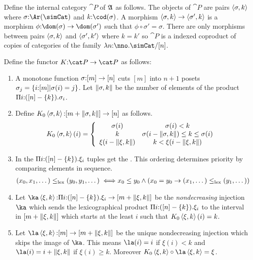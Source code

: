 \documentclass[csh.tex]{subfiles}
\begin{document}
\begin{definition}
Define the internal category $\cat P$ of $\mathfrak A$ as follows. The objects of $\cat P$ are pairs $\left\langle \sigma,k \right\rangle$ where $\sigma\of\Ar(\simCat)$ and $k\of \cod(\sigma)$. A morphism $\left\langle \sigma,k \right\rangle\to \left\langle \sigma',k \right\rangle$ is a morphism $\phi\of \dom(\sigma)\to \dom(\sigma')$ such that $\phi\circ \sigma'= \sigma$. There are only morphisms between pairs $\left\langle \sigma,k \right\rangle$ and $\left\langle \sigma',k' \right\rangle$ where $k=k'$ so $\cat P$ is a indexed coproduct of copies of categories of the family $\function{n\of\nno}\simCat/[n]$.

Define the functor $K\of \cat P\to\cat P$ as follows:
\begin{enumerate}
\item A monotone function $\sigma\mathord :[m]\to[n]$ cuts $[m]$ into $n + 1$ posets $\sigma_j = \left\{i\mathord :[m]|\sigma(i)=j\right\}$. 
 Let $\Vert \sigma,k \Vert$ be the number of elements of the product $\Pi i\mathord : ([n]-\left\{k\right\}) .{\sigma_i}$. 
\item Define $K_0\left\langle \sigma,k \right\rangle\mathord : [m+\Vert \sigma,k \Vert]\to [n]$ as follows.
\[ 
	K_0\left\langle \sigma,k \right\rangle(i) = \left\{
		\begin{array}{cc}
			\sigma(i) & \sigma(i)<k \\
			k & \sigma(i-\Vert \sigma,k \Vert)\leq k \leq \sigma(i)\\
			\xi(i-\Vert \xi,k \Vert) & k<\xi(i-\Vert \xi,k \Vert)
		\end{array}
	\right.
\]

\item In the  $\Pi i\mathord :([n]-\left\{k\right\}) .{\xi_i}$ tuples get the . This ordering determines priority by comparing elements in sequence.
\begin{align*} 
(x_0,x_1,\dotsc) \leq_{\rm lex} (y_0,y_1,\dotsc) \iff& x_0\leq y_0 \land (x_0=y_0 \to (x_1,\dotsc)\leq_{\rm lex}(y_1,\dotsc))
\end{align*}

\item Let $\ka\tuplet{\xi,k}\of\product{i\of([n]-\set k)}{\xi_i} \to [m+\norm{\xi,k}]$ be the \emph{nondecreasing} injection $\ka$ which sends the lexicographical product $\Pi i\mathord :([n]-\left\{k\right\}) .{\xi_i}$ to the interval in $[m+\Vert \xi,k \Vert]$ which starts at the least $i$ such that $K_0\left\langle \xi,k \right\rangle(i)=k$.

\item Let $\la\tuplet{\xi,k}\of[m]\to[m+\norm{\xi,k}]$ be the unique nondecreasing injection which skips the image of $\ka$. This means $\la(i)=i$ if $\xi(i)<k$ and $\la(i)=i+\norm{\xi,k}$ if $\xi(i)\geq k$. Moreover $K_0\tuplet{\xi,k}\circ\la\tuplet{\xi,k} = \xi$.


\end{enumerate}
\end{definition}
\end{document}
